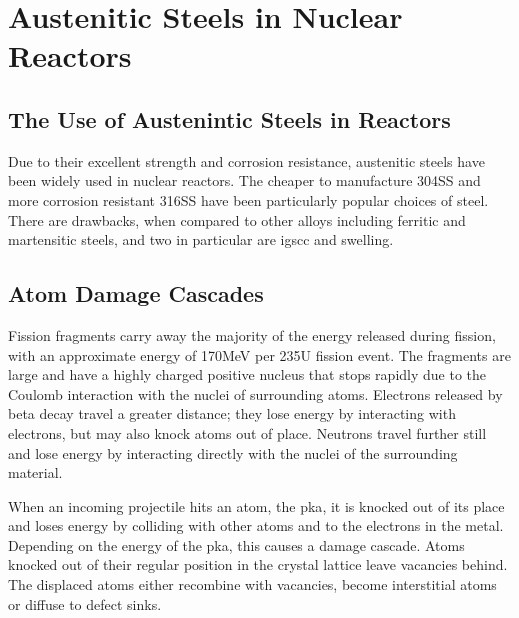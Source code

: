 


\section[Use In Reactors]{Austenitic Steels in Nuclear Reactors}

\subsection{The Use of Austenintic Steels in Reactors}

Due to their excellent strength and corrosion resistance, austenitic steels have been widely used in nuclear reactors.  The cheaper to manufacture \gls{304SS} and more corrosion resistant \gls{316SS} have been particularly popular choices of steel.  There are drawbacks, when compared to other alloys including ferritic and martensitic steels, and two in particular are \acrshort{igscc} and swelling.



\subsection{Atom Damage Cascades}

Fission fragments carry away the majority of the energy released during fission, with an approximate energy of 170MeV per 235U fission event.  The fragments are large and have a highly charged positive nucleus that stops rapidly due to the Coulomb interaction with the nuclei of surrounding atoms.  Electrons released by beta decay travel a greater distance; they lose energy by interacting with electrons, but may also knock atoms out of place.  Neutrons travel further still and lose energy by interacting directly with the nuclei of the surrounding material.

When an incoming projectile hits an atom, the \acrfull{pka}, it is knocked out of its place and loses energy by colliding with other atoms and to the electrons in the metal.  Depending on the energy of the \acrshort{pka}, this causes a damage cascade.  Atoms knocked out of their regular position in the crystal lattice leave vacancies behind.  The displaced atoms either recombine with vacancies, become interstitial atoms or diffuse to defect sinks.  

